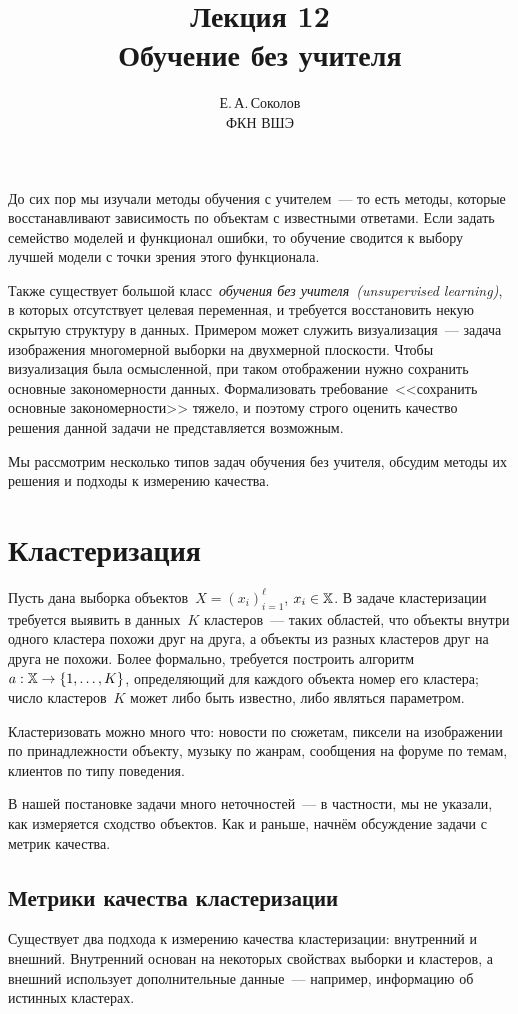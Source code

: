\documentclass[12pt,fleqn]{article}
\begin{document}
\title{Лекция 12\\Обучение без учителя}
\author{Е.\,А.\,Соколов\\ФКН ВШЭ}
\maketitle

До сих пор мы изучали методы обучения с учителем~--- то есть методы,
которые восстанавливают зависимость по объектам с известными ответами.
Если задать семейство моделей и функционал ошибки,
то обучение сводится к выбору лучшей модели с точки зрения этого функционала.

Также существует большой класс~\emph{обучения без учителя~(unsupervised learning)},
в которых отсутствует целевая переменная, и требуется восстановить
некую скрытую структуру в данных.
Примером может служить визуализация~--- задача изображения многомерной выборки
на двухмерной плоскости.
Чтобы визуализация была осмысленной, при таком отображении нужно сохранить
основные закономерности данных.
Формализовать требование~<<сохранить основные закономерности>> тяжело,
и поэтому строго оценить качество решения данной задачи не представляется возможным.

Мы рассмотрим несколько типов задач обучения без учителя, обсудим
методы их решения и подходы к измерению качества.

\section{Кластеризация}

Пусть дана выборка объектов~$X = (x_i)_{i = 1}^{\ell}$, $x_i \in \mathbb{X}$.
В задаче кластеризации требуется выявить в данных~$K$ кластеров~---
таких областей, что объекты внутри одного кластера похожи друг на друга,
а объекты из разных кластеров друг на друга не похожи.
Более формально, требуется построить алгоритм~$a: \mathbb{X} \to \{1, \dots, K\}$,
определяющий для каждого объекта номер его кластера;
число кластеров~$K$ может либо быть известно, либо являться параметром.

Кластеризовать можно много что: новости по сюжетам, пиксели на изображении по принадлежности объекту,
музыку по жанрам, сообщения на форуме по темам, клиентов по типу поведения.

В нашей постановке задачи много неточностей~---
в частности, мы не указали, как измеряется сходство объектов.
Как и раньше, начнём обсуждение задачи с метрик качества.

\subsection{Метрики качества кластеризации}
Существует два подхода к измерению качества кластеризации: внутренний и внешний.
Внутренний основан на некоторых свойствах выборки и кластеров,
а внешний использует дополнительные данные~--- например, информацию об истинных кластерах.
\end{document}
